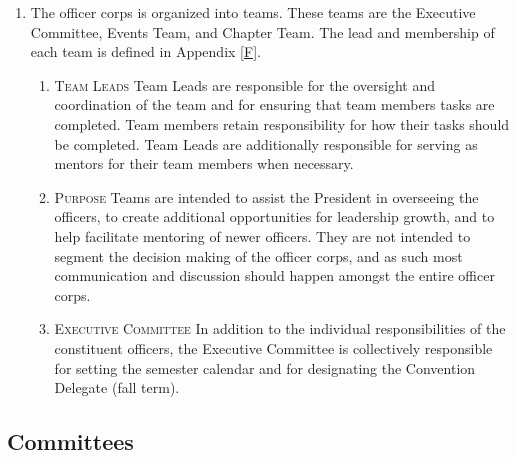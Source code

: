 \begin{enumerate}
\begin{enumerate}
\begin{enumerate}
            \item Must report to an Officer or group of Officers, who may be a member(s) of
the Chair’s Officer Team (hereafter referred to as Reporting Officer(s)). Each
Chair’s Reporting Officer(s) shall be listed in Appendix \ref{H}.
        \end{enumerate}
    \end{enumerate}
    \item {}
    The officer corps is organized into teams. These teams are the Executive
Committee, Events Team, and Chapter Team. The lead and membership of
each team is defined in Appendix \ref{F}.
    \begin{enumerate}
        \item {}\textsc{Team Leads} 
        Team Leads are responsible for the oversight and coordination
of the team and for ensuring that team members tasks are completed. Team
members retain responsibility for how their tasks should be completed. Team
Leads are additionally responsible for serving as mentors for their team members
when necessary.
        \item {}\textsc{Purpose} 
        Teams are intended to assist the President in overseeing the officers,
to create additional opportunities for leadership growth, and to help facilitate
mentoring of newer officers. They are not intended to segment the decision
making of the officer corps, and as such most communication and discussion
should happen amongst the entire officer corps.
        \item {}\textsc{Executive Committee} 
        In addition to the individual responsibilities of the constituent
officers, the Executive Committee is collectively responsible for setting
the semester calendar and for designating the Convention Delegate (fall term).
    \end{enumerate}
\end{enumerate}


\subsection{Committees} \label{I.5}

